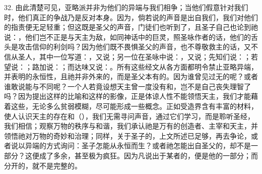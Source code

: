 32. 由此清楚可见，亚略派并非为他们的异端与我们相争；当他们假意针对我们时，他们真正的争战乃是反对本身。因为，倘若说的声音是出自我们，我们对他们的指责便无足轻重；但这既是圣父的声音，门徒们也听到了，且圣子自己也论到祂说：，他们岂不正是与天主为敌，如同神话中的巨灵，照圣咏作者的话，他们的舌头是攻击信仰的利剑吗？因为他们既不畏惧圣父的声音，也不尊敬救主的话，又不信从圣人，其中一位写道：，又说；另一位在圣咏中说：，又说；先知们说：；若望说：；路加说：；而达味又说：。所有这些经文从各方面都明令禁止亚略异端，并表明的永恒性，且祂并非外来的，而是圣父本有的。因为谁曾见过无的呢？或者谁敢说能与不同呢？一个人若竟设想天主曾一度没有和，岂不是自己丧失理智了吗？因为提出这样的比喻和这样的影像，正是体谅人性不能领悟天主，我们才能藉着这些，无论多么贫弱模糊，尽可能形成一些概念。正如受造界含有丰富的材料，使人认识天主的存在和（），我们无需寻问声音，通过它们学习，而是聆听圣经，我们相信；观察万物的秩序与和谐，我们承认祂是万有的创造者、主宰和天主，并领悟祂对万物的奇妙和治理；同样，关于圣子的，上文所述已足够，再去争论，或者说以异端的方式询问：圣子怎能从永恒而生？或者祂怎能出自圣父的，却不是一部分？这便成了多余，甚至极为疯狂。因为凡说出于某者的，便是他的一部分；而分开的，就不是完整的。\par


